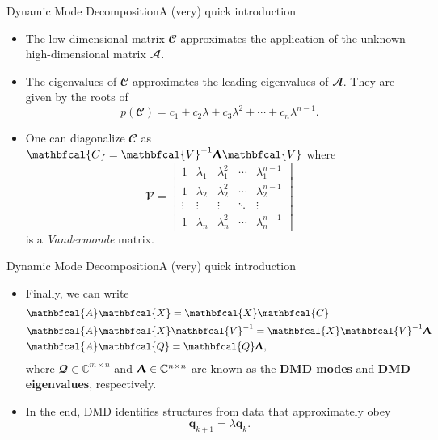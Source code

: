 \documentclass[usenames,dvipsnames,svgnames,10pt,aspectratio=169]{beamer}
\begin{document}
\begin{frame}[t, c]{Dynamic Mode Decomposition}{A (very) quick introduction}
	\begin{itemize}
		\item The low-dimensional matrix $\mathbfcal{C}$ approximates the application of the unknown high-dimensional matrix $\mathbfcal{A}$.

		\bigskip

		\item The eigenvalues of $\mathbfcal{C}$ approximates the leading eigenvalues of $\mathbfcal{A}$. They are given by the roots of
		$$p(\mathbfcal{C}) = c_1 + c_2 \lambda + c_3 \lambda^2 + \cdots + c_n \lambda^{n-1}.$$

		\medskip

		\item One can diagonalize $\mathbfcal{C}$ as $\mathbfcal{C} = \mathbfcal{V}^{-1} \boldsymbol{\Uplambda} \mathbfcal{V} $ where
		$$\mathbfcal{V} = \begin{bmatrix}
												1 & \lambda_1 & \lambda_1^2 & \cdots & \lambda_1^{n-1} \\
												1 & \lambda_2 & \lambda_2^2 & \cdots & \lambda_2^{n-1} \\
												\vdots & \vdots & \vdots & \ddots & \vdots \\
												1 & \lambda_n & \lambda_n^2 & \cdots & \lambda_n^{n-1}
											\end{bmatrix}$$
		is a \emph{Vandermonde} matrix.
	\end{itemize}

	\vspace{1cm}
\end{frame}

\begin{frame}[t, c]{Dynamic Mode Decomposition}{A (very) quick introduction}
	\begin{itemize}
		\item Finally, we can write
		\begin{equation}
			\begin{aligned}
				& \mathbfcal{A} \mathbfcal{X} = \mathbfcal{X} \mathbfcal{C} \\
				& \mathbfcal{A} \mathbfcal{X} \mathbfcal{V}^{-1} = \mathbfcal{X} \mathbfcal{V}^{-1} \boldsymbol{\Uplambda} \\
				& \mathbfcal{A} \mathbfcal{Q} = \mathbfcal{Q} \boldsymbol{\Uplambda},
			\end{aligned}
			\notag
		\end{equation}
		where $\mathbfcal{Q} \in \mathbb{C}^{m \times n}$ and $\boldsymbol{\Uplambda} \in \mathbb{C}^{n \times n}$ are known as the \alert{\textbf{DMD modes}} and \alert{\textbf{DMD eigenvalues}}, respectively.

		\bigskip

		\item In the end, DMD identifies structures from data that approximately obey
		$$\mathbf{q}_{k+1} = \lambda \mathbf{q}_{k}.$$
	\end{itemize}

	\vspace{1cm}
\end{frame}
\end{document}
